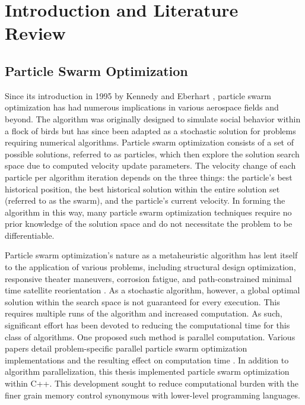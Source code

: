\chapter{Introduction and Literature Review}
\newpage


\section{Particle Swarm Optimization}

\noindent Since its introduction in 1995 by Kennedy and Eberhart \citep{Initial_PSO}, particle swarm optimization has had numerous implications in various aerospace fields and beyond.
The algorithm was originally designed to simulate social behavior within a flock of birds but has since been adapted as a stochastic solution for problems
requiring numerical algorithms. Particle swarm optimization consists of a set of possible solutions, referred to as particles, which then explore the solution search space due to
computed velocity update parameters. The velocity change of each particle per algorithm iteration depends on the three things: the particle's best historical position, the best historical
solution within the entire solution set (referred to as the swarm), and the particle's current velocity. In forming the algorithm in this way, many particle swarm optimization techniques 
require no prior knowledge of the solution space and do not necessitate the problem to be differentiable. \newline

\noindent Particle swarm optimization's nature as a metaheuristic algorithm has lent itself to the application of various problems,
including structural design optimization, responsive theater maneuvers, corrosion fatigue, and path-constrained minimal time satellite reorientation
\citep{PSO1, PSO2, PSO3, PSO4}. As a stochastic algorithm, however, a global optimal solution within the search space is not guaranteed for every execution. 
This requires multiple runs of the algorithm and increased computation. As such, significant effort has been devoted to reducing the computational time for this class of
algorithms. One proposed such method is parallel computation. Various papers detail problem-specific parallel particle swarm optimization implementations and the resulting 
effect on computation time \citep{PPSO1, PPSO2, PPSO3}. In addition to algorithm parallelization, this thesis implemented particle swarm optimization within C++.
This development sought to reduce computational
burden with the finer grain memory control synonymous with lower-level programming languages. \newline

